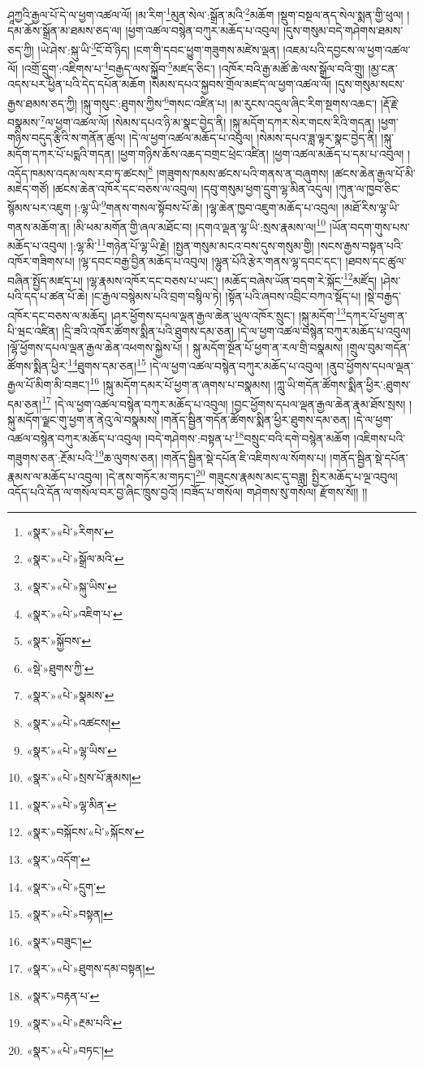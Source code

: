 ཤཱཀྱའི་རྒྱལ་པོ་དེ་ལ་ཕྱག་འཚལ་ལོ། །མ་རིག་\footnote{«སྣར་»«པེ་»རིགས་}མུན་སེལ་:སྒྲོན་མའི་\footnote{«སྣར་»«པེ་»སྒྲོལ་མའི་}མཆོག །སྡུག་བསྔལ་ནད་སེལ་སྨན་གྱི་ཕུལ། །དམ་ཆོས་སྒྲོན་མ་ཐམས་ཅད་ལ། །ཕྱག་འཚལ་བསྙེན་བཀུར་མཆོད་པ་འབུལ། །དུས་གསུམ་བདེ་གཤེགས་ཐམས་ཅད་ཀྱི། །ཡེ་ཤེས་:སྐུ་ཡི་\footnote{«སྣར་»«པེ་»སྐུ་ཡིས་}ངོ་བོ་ཉིད། །ངག་གི་དབང་ཕྱུག་གཟུགས་མཛེས་ལྡན། །འཇམ་པའི་དབྱངས་ལ་ཕྱག་འཚལ་ལོ། །འགྲོ་དྲུག་:འཇིགས་པ་\footnote{«སྣར་»«པེ་»འཇིག་པ་}བརྒྱད་ལས་སྐྱོབ་\footnote{«སྣར་»སྐྱོབས་}མཛད་ཅིང་། །འཁོར་བའི་རྒྱ་མཚོ་ཆེ་ལས་སྒྲོལ་བའི་གྲུ། །མྱ་ངན་འདས་པར་ཕྱིན་པའི་དེད་དཔོན་མཆོག །སེམས་དཔའ་སྐྱབས་གྲོལ་མཛད་ལ་ཕྱག་འཚལ་ལོ། །དུས་གསུམ་སངས་རྒྱས་ཐམས་ཅད་ཀྱི། །སྐུ་གསུང་:ཐུགས་ཀྱིས་\footnote{«སྡེ་»ཐུགས་ཀྱི་}གསང་འཛིན་པ། །མ་རུངས་འདུལ་ཞིང་རིག་སྔགས་འཆང་། །རྡོ་རྗེ་བསྣམས་\footnote{«སྣར་»«པེ་»སྣམས་}ལ་ཕྱག་འཚལ་ལོ། །སེམས་དཔའ་ཉི་མ་སྣང་བྱེད་ནི། །སྐུ་མདོག་དཀར་སེར་གངས་རིའི་གདན། །ཕྱག་གཉིས་བདུད་རྩིའི་ས་གནོན་ཚུལ། །དེ་ལ་ཕྱག་འཚལ་མཆོད་པ་འབུལ། །སེམས་དཔའ་ཟླ་ལྟར་སྣང་བྱེད་ནི། །སྐུ་མདོག་དཀར་པོ་པདྨའི་གདན། །ཕྱག་གཉིས་ཆོས་འཆད་བགྲང་ཕྲེང་འཛིན། །ཕྱག་འཚལ་མཆོད་པ་དམ་པ་འབུལ། །འདོད་ཁམས་འདམ་ལས་རབ་ཏུ་ཚངས།\footnote{«སྣར་»«པེ་»འཚངས།} །གཟུགས་ཁམས་ཚངས་པའི་གནས་ན་བཞུགས། །ཚངས་ཆེན་རྒྱལ་པོ་མི་མཇེད་གཙོ། །ཚངས་ཆེན་འཁོར་དང་བཅས་ལ་འབུལ། །དབུ་གསུམ་ཕྱག་དྲུག་ལྷ་མིན་འདུལ། །ཀུན་ལ་ཁྱབ་ཅིང་སྙོམས་པར་འཇུག །:ལྷ་ཡི་\footnote{«སྣར་»«པེ་»ལྷ་ཡིས་}གནས་གསལ་སྟོབས་པོ་ཆེ། །ལྷ་ཆེན་ཁྱབ་འཇུག་མཆོད་པ་འབུལ། །མཐོ་རིས་ལྷ་ཡི་གནས་མཆོག་ན། །མི་ཕམ་མགོན་གྱི་ཞལ་མཐོང་བ། །དགའ་ལྡན་ལྷ་ཡི་:སྲས་རྣམས་ལ།\footnote{«སྣར་»«པེ་»སྲས་པོ་རྣམས།} །ཡོན་བདག་གུས་པས་མཆོད་པ་འབུལ། །:ལྷ་མི་\footnote{«སྣར་»«པེ་»ལྷ་མིན་}གཉེན་པོ་ལྷ་ཡི་རྗེ། །སྤྱན་གསུམ་མངའ་བས་དུས་གསུམ་གྱི། །སངས་རྒྱས་བསྟན་པའི་འཁོར་གཟིགས་པ། །ལྷ་དབང་བརྒྱ་བྱིན་མཆོད་པ་འབུལ། །ལྷུན་པོའི་རྩེར་གནས་ལྷ་དབང་དང་། །ཐབས་དང་ཚུལ་བཞིན་སྤྱོད་མཛད་པ། །ལྷ་རྣམས་འཁོར་དང་བཅས་པ་ཡང་། །མཆོད་བཞེས་ཡོན་བདག་རེ་སྐོང་\footnote{«སྣར་»བསྐོངས་«པེ་»སྐོངས་}མཛོད། །ཤེས་པའི་དད་པ་ཚན་པོ་ཆེ། །ང་རྒྱལ་བསྙེམས་པའི་བྲག་བསྙིལ་ཏེ། །སྟོན་པའི་ཞབས་འབྲིང་བཀའ་སྡོད་པ། །སྡེ་བརྒྱད་འཁོར་དང་བཅས་ལ་མཆོད། །ཤར་ཕྱོགས་དཔལ་ལྡན་རྒྱལ་ཆེན་ཡུལ་འཁོར་སྲུང་། །སྐུ་མདོག་\footnote{«སྣར་»འདོག་}དཀར་པོ་ཕྱག་ན་པི་ཝང་འཛིན། །དྲི་ཟའི་འཁོར་ཚོགས་སྨིན་པའི་ཐུགས་དམ་ཅན། །དེ་ལ་ཕྱག་འཚལ་བསྙེན་བཀུར་མཆོད་པ་འབུལ། །ལྷོ་ཕྱོགས་དཔལ་ལྡན་རྒྱལ་ཆེན་འཕགས་སྐྱེས་པོ། །
སྐུ་མདོག་སྔོན་པོ་ཕྱག་ན་རལ་གྲི་བསྣམས། །གྲུལ་བུམ་གདོན་ཚོགས་སྨིན་ཕྱིར་\footnote{«སྣར་»«པེ་»དྲུག་}ཐུགས་དམ་ཅན།\footnote{«སྣར་»«པེ་»བསྟན།} །དེ་ལ་ཕྱག་འཚལ་བསྙེན་བཀུར་མཆོད་པ་འབུལ། །ནུབ་ཕྱོགས་དཔལ་ལྡན་རྒྱལ་པོ་མིག་མི་བཟང་།\footnote{«སྣར་»བཟུང་།} །སྐུ་མདོག་དམར་པོ་ཕྱག་ན་ཞགས་པ་བསྣམས། །ཀླུ་ཡི་གདོན་ཚོགས་སྨིན་ཕྱིར་:ཐུགས་དམ་ཅན།\footnote{«སྣར་»«པེ་»ཐུགས་དམ་བསྟན།} །དེ་ལ་ཕྱག་འཚལ་བསྙེན་བཀུར་མཆོད་པ་འབུལ། །བྱང་ཕྱོགས་དཔལ་ལྡན་རྒྱལ་ཆེན་རྣམ་ཐོས་སྲས། །སྐུ་མདོག་ལྗང་གུ་ཕྱག་ན་ནེའུ་ལེ་བསྣམས། །གནོད་སྦྱིན་གདོན་ཚོགས་སྨིན་ཕྱིར་ཐུགས་དམ་ཅན། །དེ་ལ་ཕྱག་འཚལ་བསྙེན་བཀུར་མཆོད་པ་འབུལ། །བདེ་གཤེགས་:བསྟན་པ་\footnote{«སྣར་»བརྟན་པ་}བསྲུང་བའི་དགེ་བསྙེན་མཆོག །འཇིགས་པའི་གཟུགས་ཅན་:རྔོམ་པའི་\footnote{«སྣར་»«པེ་»རྔམ་པའི་}ཆ་ལུགས་ཅན། །གནོད་སྦྱིན་སྡེ་དཔོན་ཇི་འཇིགས་ལ་སོགས་པ། །གནོད་སྦྱིན་སྡེ་དཔོན་རྣམས་ལ་མཆོད་པ་འབུལ། །དེ་ནས་གཏོར་མ་གཏང་།\footnote{«སྣར་»«པེ་»བཏང་།} གཟུངས་རྣམས་མང་དུ་བཟླ། སྤྱིར་མཆོད་པ་ལྔ་འབུལ། འདོད་པའི་དོན་ལ་གསོལ་བར་བྱ་ཞིང་ཁྲུས་བྱའོ། །བཟོད་པ་གསོལ། གཤེགས་སུ་གསོལ། རྫོགས་སོ།། །།